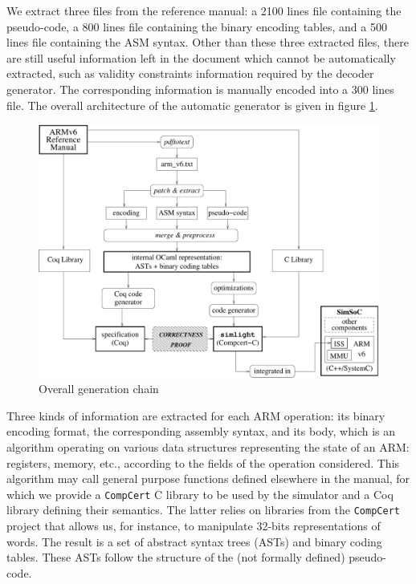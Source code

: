 \documentclass[twocolumn]{article}
\newcommand{\compcert}{\texttt{CompCert}\xspace}
\begin{document}
We extract three files from the reference manual: a 2100 lines file
containing the pseudo-code, a 800 lines file containing the binary
encoding tables, and a 500 lines file containing the ASM syntax.
Other than these three extracted files, there are still useful
information left in the document which cannot be automatically
extracted, such as validity constraints information required by the
decoder generator.  The corresponding information is manually encoded
into a 300 lines file. The overall architecture of the automatic
generator is given in figure \ref{fig:arch}.

\begin{figure}
\hfil\includegraphics[width=\linewidth]{fig/fullarchi.pdf}
\caption{Overall generation chain}
\label{fig:arch}
\end{figure}

Three kinds of information are extracted for each ARM operation: its
binary encoding format, the corresponding assembly syntax, and its
body, which is an algorithm operating on various data structures
representing the state of an ARM: registers, memory, etc., according
to the fields of the operation considered. This algorithm may call
general purpose functions defined elsewhere in the manual, for which
we provide a \compcert C library to be used by the simulator and a Coq
library defining their semantics. The latter relies on libraries from
the \compcert project that allows us, for instance, to manipulate
32-bits representations of words. The result is a set of abstract
syntax trees (ASTs) and binary coding tables. These ASTs follow the
structure of the (not formally defined) pseudo-code.
\end{document}
